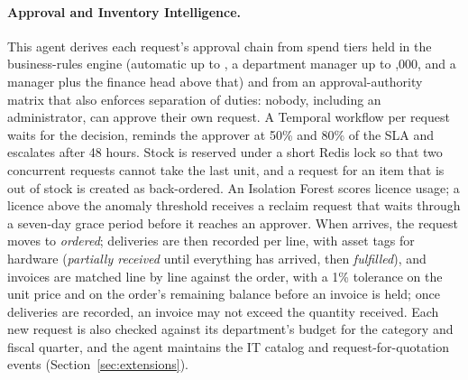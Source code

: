 \paragraph{Approval and Inventory Intelligence.} This agent derives each request's approval chain from spend tiers held in the business-rules engine (automatic up to , a department manager up to ,000, and a manager plus the finance head above that) and from an approval-authority matrix that also enforces separation of duties: nobody, including an administrator, can approve their own request. A Temporal workflow per request waits for the decision, reminds the approver at 50\% and 80\% of the SLA and escalates after 48 hours. Stock is reserved under a short Redis lock so that two concurrent requests cannot take the last unit, and a request for an item that is out of stock is created as back-ordered. An Isolation Forest scores licence usage; a licence above the anomaly threshold receives a reclaim request that waits through a seven-day grace period before it reaches an approver. When  arrives, the request moves to \emph{ordered}; deliveries are then recorded per line, with asset tags for hardware (\emph{partially received} until everything has arrived, then \emph{fulfilled}), and invoices are matched line by line against the order, with a 1\% tolerance on the unit price and on the order's remaining balance before an invoice is held; once deliveries are recorded, an invoice may not exceed the quantity received. Each new request is also checked against its department's budget for the category and fiscal quarter, and the agent maintains the IT catalog and request-for-quotation events (Section~\ref{sec:extensions}).

